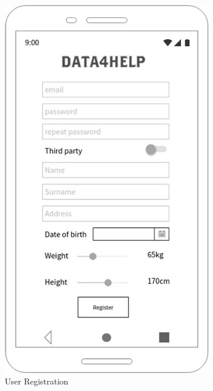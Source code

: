 \begin{figure}[h!]
  \centering

  \begin{subfigure}[b]{0.25\linewidth}

    \includegraphics[width=\linewidth]{img/mockup/u_registration.jpg}

    \caption{User Registration}

  \end{subfigure}
 ~ ~ ~ ~ ~ ~
  \begin{subfigure}[b]{0.25\linewidth}


\end{subfigure}
\end{figure}
